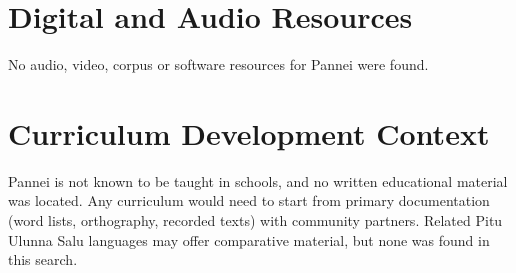 \documentclass[12pt]{article}
\begin{document}
\section{Digital and Audio Resources}
No audio, video, corpus or software resources for Pannei were found.

\section{Curriculum Development Context}
Pannei is not known to be taught in schools, and no written educational material was located. Any curriculum would need to start from primary documentation (word lists, orthography, recorded texts) with community partners. Related Pitu Ulunna Salu languages may offer comparative material, but none was found in this search.
\end{document}
